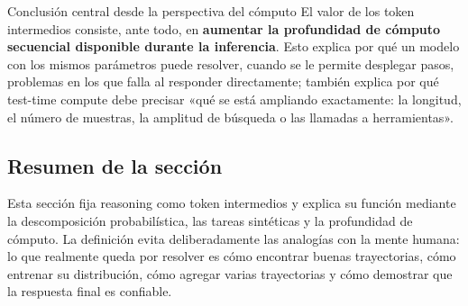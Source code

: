 \begin{importantbox}{Conclusión central desde la perspectiva del cómputo}
El valor de los token intermedios consiste, ante todo, en \textbf{aumentar la profundidad de cómputo secuencial disponible durante la inferencia}. Esto explica por qué un modelo con los mismos parámetros puede resolver, cuando se le permite desplegar pasos, problemas en los que falla al responder directamente; también explica por qué test-time compute debe precisar «qué se está ampliando exactamente: la longitud, el número de muestras, la amplitud de búsqueda o las llamadas a herramientas».
\end{importantbox}

\subsection{Resumen de la sección}

Esta sección fija reasoning como token intermedios y explica su función mediante la descomposición probabilística, las tareas sintéticas y la profundidad de cómputo. La definición evita deliberadamente las analogías con la mente humana: lo que realmente queda por resolver es cómo encontrar buenas trayectorias, cómo entrenar su distribución, cómo agregar varias trayectorias y cómo demostrar que la respuesta final es confiable.
